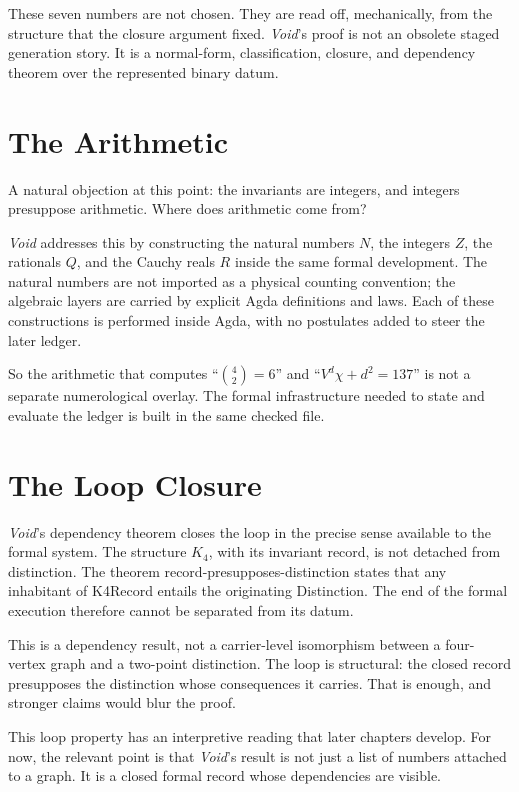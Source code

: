 \documentclass[11pt,a4paper]{book}
\def\mathbb#1{#1}%
\def\texttt#1{#1}%
\begin{document}
These seven numbers are not chosen. They are read off, mechanically, from the structure that the closure argument fixed. \textit{Void}'s proof is not an obsolete staged generation story. It is a normal-form, classification, closure, and dependency theorem over the represented binary datum.

\section*{The Arithmetic}

A natural objection at this point: the invariants are integers, and integers presuppose arithmetic. Where does arithmetic come from?

\textit{Void} addresses this by constructing the natural numbers $\mathbb{N}$, the integers $\mathbb{Z}$, the rationals $\mathbb{Q}$, and the Cauchy reals $\mathbb{R}$ inside the same formal development. The natural numbers are not imported as a physical counting convention; the algebraic layers are carried by explicit Agda definitions and laws. Each of these constructions is performed inside Agda, with no postulates added to steer the later ledger.

So the arithmetic that computes ``$\binom{4}{2} = 6$'' and ``$V^d \chi + d^2 = 137$'' is not a separate numerological overlay. The formal infrastructure needed to state and evaluate the ledger is built in the same checked file.

\section*{The Loop Closure}

\textit{Void}'s dependency theorem closes the loop in the precise sense available to the formal system. The structure $K_4$, with its invariant record, is not detached from distinction. The theorem \texttt{record-presupposes-distinction} states that any inhabitant of \texttt{K4Record} entails the originating \texttt{Distinction}. The end of the formal execution therefore cannot be separated from its datum.

This is a dependency result, not a carrier-level isomorphism between a four-vertex graph and a two-point distinction. The loop is structural: the closed record presupposes the distinction whose consequences it carries. That is enough, and stronger claims would blur the proof.

This loop property has an interpretive reading that later chapters develop. For now, the relevant point is that \textit{Void}'s result is not just a list of numbers attached to a graph. It is a closed formal record whose dependencies are visible.
\end{document}
